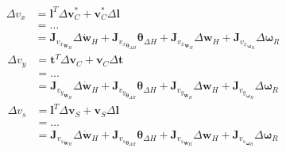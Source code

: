 \begin{equation}
    \begin{split}
        \Delta v_x &= \mathbf{l}^T \Delta\mathbf{v}_{C}^* + \mathbf{v}_{C}^*\Delta\mathbf{l}\\
        &= \dots \\
        &= \mathbf{J}_{{v_x}_{\dot{\mathbf{w}}_H}}\Delta \dot{\mathbf{w}}_H + \mathbf{J}_{{v_x}_{\boldsymbol{\theta}_{\Delta H}}} \boldsymbol{\theta}_{\Delta H} + \mathbf{J}_{{v_x}_{\mathbf{w}_H}}\Delta \mathbf{w}_H + \mathbf{J}_{{v_x}_{\boldsymbol{\omega}_R}} \Delta \boldsymbol{\omega}_R
    \end{split}
\end{equation}
\begin{equation}
    \begin{split}
        \Delta v_y &= \mathbf{t}^T \Delta\mathbf{v}_{C} + \mathbf{v}_{C}\Delta\mathbf{t}\\
        &= \dots \\
        &= \mathbf{J}_{{v_y}_{\dot{\mathbf{w}}_H}}\Delta \dot{\mathbf{w}}_H + \mathbf{J}_{{v_y}_{\boldsymbol{\theta}_{\Delta H}}} \boldsymbol{\theta}_{\Delta H} + \mathbf{J}_{{v_y}_{\mathbf{w}_H}}\Delta \mathbf{w}_H + \mathbf{J}_{{v_y}_{\boldsymbol{\omega}_R}} \Delta \boldsymbol{\omega}_R
    \end{split}
\end{equation}
\begin{equation}
    \begin{split}
        \Delta v_s &= \mathbf{l}^T \Delta\mathbf{v}_{S} + \mathbf{v}_{S}\Delta\mathbf{l}\\
        &= \dots \\
        &= \mathbf{J}_{{v_s}_{\dot{\mathbf{w}}_H}}\Delta \dot{\mathbf{w}}_H + \mathbf{J}_{{v_s}_{\boldsymbol{\theta}_{\Delta H}}} \boldsymbol{\theta}_{\Delta H} + \mathbf{J}_{{v_s}_{\mathbf{w}_H}}\Delta \mathbf{w}_H + \mathbf{J}_{{v_s}_{\boldsymbol{\omega}_R}} \Delta \boldsymbol{\omega}_R
    \end{split}
\end{equation}
